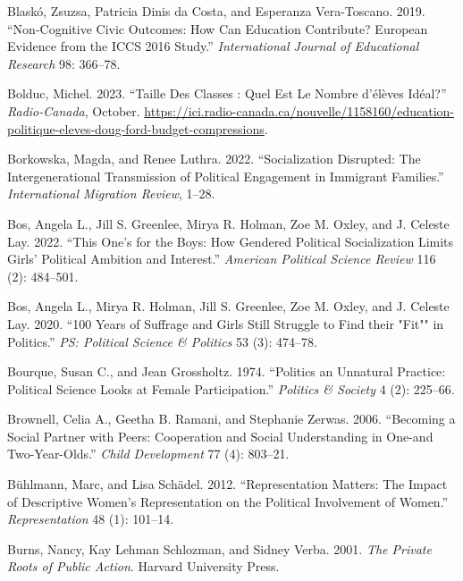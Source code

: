 \documentclass[
  letterpaper,
  DIV=11,
  numbers=noendperiod]{scrreprt}
\newlength{\cslhangindent}
\newlength{\cslentryspacingunit} %
\newenvironment{CSLReferences}[2] %
 {%
  \setlength{\parindent}{0pt}
  \ifodd #1
  \let\oldpar\par
  \def\par{\hangindent=\cslhangindent\oldpar}
  \fi
  \setlength{\parskip}{#2\cslentryspacingunit}
 }%
 {}
\begin{document}
\begin{CSLReferences}{1}{0}
\leavevmode{}%
Blaskó, Zsuzsa, Patricia Dinis da Costa, and Esperanza Vera-Toscano.
2019. {``{Non-Cognitive Civic Outcomes: How Can Education Contribute?
European Evidence from the ICCS 2016 Study}.''} \emph{{International
Journal of Educational Research}} 98: 366--78.

\leavevmode{}%
Bolduc, Michel. 2023. {``Taille Des Classes : Quel Est Le Nombre
d'élèves Idéal?''} \emph{Radio-Canada}, October.
\url{https://ici.radio-canada.ca/nouvelle/1158160/education-politique-eleves-doug-ford-budget-compressions}.

\leavevmode{}%
Borkowska, Magda, and Renee Luthra. 2022. {``{Socialization Disrupted:
The Intergenerational Transmission of Political Engagement in Immigrant
Families}.''} \emph{{International Migration Review}}, 1--28.

\leavevmode{}%
Bos, Angela L., Jill S. Greenlee, Mirya R. Holman, Zoe M. Oxley, and J.
Celeste Lay. 2022. {``This One's for the Boys: How Gendered Political
Socialization Limits Girls' Political Ambition and Interest.''}
\emph{American Political Science Review} 116 (2): 484--501.

\leavevmode{}%
Bos, Angela L., Mirya R. Holman, Jill S. Greenlee, Zoe M. Oxley, and J.
Celeste Lay. 2020. {``{100 Years of Suffrage and Girls Still Struggle to
Find their "Fit"" in Politics}.''} \emph{PS: Political Science \&
Politics} 53 (3): 474--78.

\leavevmode{}%
Bourque, Susan C., and Jean Grossholtz. 1974. {``{Politics an Unnatural
Practice: Political Science Looks at Female Participation}.''}
\emph{Politics \& Society} 4 (2): 225--66.

\leavevmode{}%
Brownell, Celia A., Geetha B. Ramani, and Stephanie Zerwas. 2006.
{``{Becoming a Social Partner with Peers: Cooperation and Social
Understanding in One-and Two-Year-Olds}.''} \emph{Child Development} 77
(4): 803--21.

\leavevmode{}%
Bühlmann, Marc, and Lisa Schädel. 2012. {``{Representation Matters: The
Impact of Descriptive Women's Representation on the Political
Involvement of Women}.''} \emph{Representation} 48 (1): 101--14.

\leavevmode{}%
Burns, Nancy, Kay Lehman Schlozman, and Sidney Verba. 2001. \emph{{The
Private Roots of Public Action}}. Harvard University Press.


\end{CSLReferences}
\end{document}
